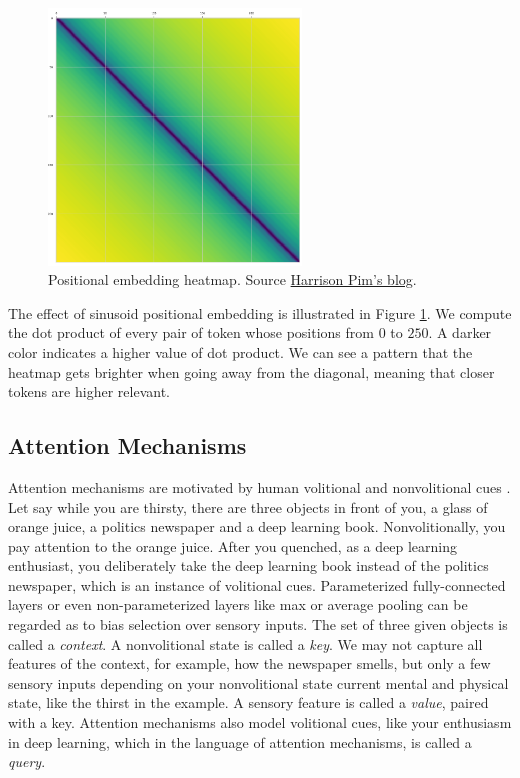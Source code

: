 \begin{figure}[ht]
  \centering
  \includegraphics[width=0.6\textwidth]{img/positional-embedding-heatmap.png}
  \captionsetup{justification=centering} %
  \caption[Positional embedding heatmap]{Positional embedding heatmap. Source \href{harrisonpim.com/blog/understanding-positional-embeddings-in-transformer-models}{Harrison Pim's blog}.}
  \label{figure:positional-embedding-heatmap}
\end{figure}

The effect of sinusoid positional embedding is illustrated in Figure \ref{figure:positional-embedding-heatmap}. We compute the dot product of every pair of token whose positions from $0$ to $250$. A darker color indicates a higher value of dot product. We can see a pattern that the heatmap gets brighter when going away from the diagonal, meaning that closer tokens are higher relevant.

\subsection{Attention Mechanisms}

Attention mechanisms are motivated by human volitional and nonvolitional cues \cite{zhang2023dive}. Let say while you are thirsty, there are three objects in front of you, a glass of orange juice, a politics newspaper and a deep learning book. Nonvolitionally, you pay attention to the orange juice. After you quenched, as a deep learning enthusiast, you deliberately take the deep learning book instead of the politics newspaper, which is an instance of volitional cues. Parameterized fully-connected layers or even non-parameterized layers like max or average pooling can be regarded as to bias selection over sensory inputs. The set of three given objects is called a \textit{context}. A nonvolitional state is called a \textit{key}. We may not capture all features of the context, for example, how the newspaper smells, but only a few sensory inputs depending on your nonvolitional state current mental and physical state, like the thirst in the example.  A sensory feature is called a \textit{value}, paired with a key. Attention mechanisms also model volitional cues, like your enthusiasm in deep learning, which in the language of attention mechanisms, is called a \textit{query}.

